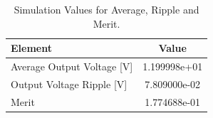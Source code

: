 \begin{table}[h]
    \centering
    \begin{tabular}{|l|c|}
    \hline
    {\bf Element } & {\bf Value } \\
    \hline \hline
    Average Output Voltage [V] & 1.199998e+01 \\  
    \hline
    Output Voltage Ripple [V] & 7.809000e-02 \\
    \hline
    Merit &  1.774688e-01 \\
    \hline
    \end{tabular}
    \caption{Simulation Values for Average, Ripple and Merit.}
    \label{tab:tsim1}
\end{table}







